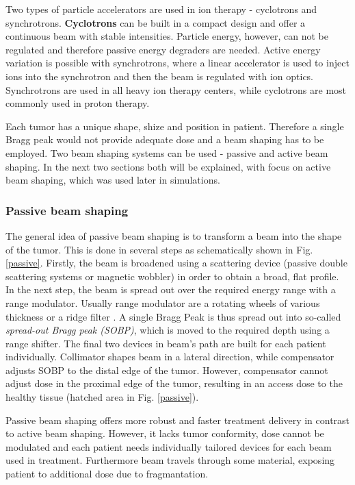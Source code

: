 \documentclass[type=dr, dr=rernat, accentcolor=tud7b,colorbacktitle, bigchapter, openright, twoside, 12pt ]{tudthesis}
\begin{document}
Two types of particle accelerators are used in ion therapy - cyclotrons and synchrotrons. \textbf{Cyclotrons} can be built in a compact design and offer a continuous beam with
stable intensities. Particle energy, however, can not be regulated and therefore passive energy degraders are needed. Active energy variation is possible with synchrotrons, where a linear
accelerator is used to inject ions into the synchrotron and then the beam is regulated with ion optics. Synchrotrons are used in all heavy ion therapy centers, while cyclotrons are most
commonly used in proton therapy.

Each tumor has a unique shape, shize and position in patient. Therefore a single Bragg peak would not provide adequate dose and a beam shaping has to be employed. Two beam shaping systems
can be used - passive and active beam shaping. In the next two sections both will be explained, with focus on active beam shaping, which was used later in simulations.


\subsubsection{Passive beam shaping}

The general idea of passive beam shaping is to transform a beam into the shape of the tumor. This is done in several steps as schematically shown in Fig. \ref{passive}. Firstly, the beam is broadened using a scattering device (passive double scattering systems or magnetic wobbler)
 in order to obtain a broad, flat profile. In the next step, the beam is spread out over the required energy range with a range modulator. Usually range modulator are a rotating wheels of various thickness or a ridge filter \cite{Chu1993}.
 A single Bragg Peak is thus spread out into so-called \textit{spread-out Bragg peak (SOBP)}, which is moved to the required depth using a range shifter. The final two devices in beam's path are built for each patient individually. Collimator
 shapes beam in a lateral direction, while compensator adjusts SOBP to the distal edge of the tumor. However, compensator cannot adjust dose in the proximal edge of the tumor, resulting in an access dose to the healthy tissue (hatched area in
 Fig. \ref{passive}).
 
 Passive beam shaping offers more robust and faster treatment delivery in contrast to active beam shaping. However, it lacks tumor conformity, dose cannot be modulated and each patient needs individually tailored devices for each beam used in treatment.
 Furthermore beam travels through some material, exposing patient to additional dose due to fragmantation.
\end{document}
